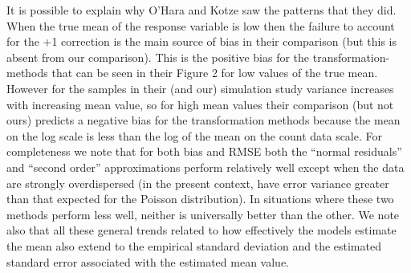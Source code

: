 \documentclass[]{article}
\begin{document}
It is possible to explain why O'Hara and Kotze saw the patterns that
they did. When the true mean of the response variable is low then the
failure to account for the +1 correction is the main source of bias in
their comparison (but this is absent from our comparison). This is the
positive bias for the transformation-methods that can be seen in their
Figure 2 for low values of the true mean. However for the samples in
their (and our) simulation study variance increases with increasing mean
value, so for high mean values their comparison (but not ours) predicts
a negative bias for the transformation methods because the mean on the
log scale is less than the log of the mean on the count data scale. For
completeness we note that for both bias and RMSE both the ``normal
residuals'' and ``second order'' approximations perform relatively well
except when the data are strongly overdispersed (in the present context,
have error variance greater than that expected for the Poisson
distribution). In situations where these two methods perform less well,
neither is universally better than the other. We note also that all
these general trends related to how effectively the models estimate the
mean also extend to the empirical standard deviation and the estimated
standard error associated with the estimated mean value.
\end{document}
